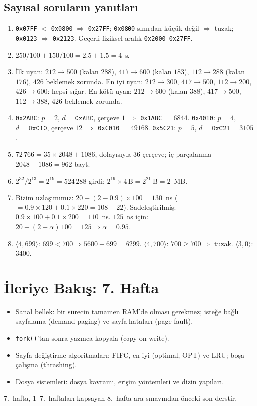 \documentclass[11pt,a4paper]{article}
\newcommand{\cmd}[1]{\texttt{#1}}
\begin{document}
\subsection*{Sayısal soruların yanıtları}
\begin{enumerate}[leftmargin=1.6em,start=14]
  \item \texttt{0x07FF} $<$ \texttt{0x0800} $\Rightarrow$ \texttt{0x27FF}; \texttt{0x0800} sınırdan küçük değil $\Rightarrow$ tuzak; \texttt{0x0123} $\Rightarrow$ \texttt{0x2123}. Geçerli fiziksel aralık \texttt{0x2000}--\texttt{0x27FF}.
  \item $250/100 + 150/100 = 2.5 + 1.5 = 4$~s.
  \item İlk uyan: $212\to500$ (kalan $288$), $417\to600$ (kalan $183$), $112\to288$ (kalan $176$), $426$ beklemek zorunda. En iyi uyan: $212\to300$, $417\to500$, $112\to200$, $426\to600$: hepsi sığar. En kötü uyan: $212\to600$ (kalan $388$), $417\to500$, $112\to388$, $426$ beklemek zorunda.
  \item \texttt{0x2ABC}: $p=2$, $d=\texttt{0xABC}$, çerçeve $1$ $\Rightarrow$ \texttt{0x1ABC} $= 6844$. \texttt{0x4010}: $p=4$, $d=\texttt{0x010}$, çerçeve $12$ $\Rightarrow$ \texttt{0xC010} $= 49168$. \texttt{0x5C21}: $p=5$, $d=\texttt{0xC21} = 3105$.
  \item $72\,766 = 35 \times 2048 + 1086$, dolayısıyla $36$ çerçeve; iç parçalanma $2048 - 1086 = 962$ bayt.
  \item $2^{32}/2^{13} = 2^{19} = 524\,288$ girdi; $2^{19}\times 4\ \text{B} = 2^{21}\ \text{B} = 2$~MB.
  \item Bizim uzlaşımımız: $20 + (2-0.9)\times100 = 130$~ns ($= 0.9\times120 + 0.1\times220 = 108 + 22$). Sadeleştirilmiş: $0.9\times100 + 0.1\times200 = 110$~ns. $125$~ns için: $20 + (2-\alpha)\,100 = 125 \Rightarrow \alpha = 0.95$.
  \item $\langle 4, 699\rangle$: $699 < 700 \Rightarrow 5600 + 699 = 6299$. $\langle 4, 700\rangle$: $700 \ge 700 \Rightarrow$ tuzak. $\langle 3, 0\rangle$: $3400$.
\end{enumerate}

\section{İleriye Bakış: 7. Hafta}

\begin{itemize}
  \item Sanal bellek: bir sürecin tamamen RAM'de olması gerekmez; isteğe bağlı sayfalama (demand paging) ve sayfa hataları (page fault).
  \item \cmd{fork()}'tan sonra yazınca kopyala (copy-on-write).
  \item Sayfa değiştirme algoritmaları: FIFO, en iyi (optimal, OPT) ve LRU; boşa çalışma (thrashing).
  \item Dosya sistemleri: dosya kavramı, erişim yöntemleri ve dizin yapıları.
\end{itemize}
7.~hafta, 1--7.~haftaları kapsayan 8.~hafta ara sınavından önceki son derstir.
\end{document}
